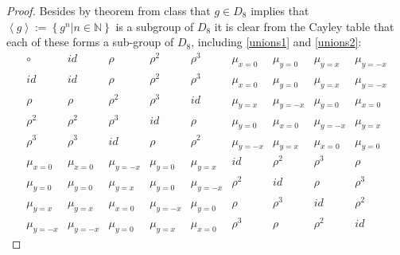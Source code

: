 \documentclass{article}
\theoremstyle{definition}
\newcommand{\N}{\mathbb{N}}
\begin{document}
\begin{proof}
		Besides by theorem from class that $g\in D_8$ implies that $\left\langle g\right\rangle := \left\{g^n|n\in\N\right\}$ is a subgroup of $D_8$ it is clear from the Cayley table that each of these forms a sub-group of $D_8$, including \eqref{unions1} and \eqref{unions2}:
		$$\begin{array}{c|cccccccc}
		\circ & id & \rho & \rho^2 & \rho^3 & \mu_{x=0} & \mu_{y=0} & \mu_{y=x} & \mu_{y=-x} \\ \hline
		id & id & \rho & \rho^2 & \rho^3 & \mu_{x=0} & \mu_{y=0} & \mu_{y=x} & \mu_{y=-x} \\ 
		\rho & \rho &  \rho^2&  \rho^3&  id&  \mu_{y=x}&  \mu_{y=-x}&  \mu_{y=0}&  \mu_{x=0}\\ 
		\rho^2&  \rho^2&  \rho^3&  id&  \rho&  \mu_{y=0}&  \mu_{x=0}&  \mu_{y=-x}&  \mu_{y=x}\\ 
		\rho^3&  \rho^3&  id&  \rho&  \rho^2&  \mu_{y=-x}&  \mu_{y=x}&  \mu_{x=0}&  \mu_{y=0}\\ 
		\mu_{x=0}&  \mu_{x=0}&  \mu_{y=-x}&  \mu_{y=0}&  \mu_{y=x}&  id&  \rho^2&  \rho^3&  \rho\\ 
		\mu_{y=0}&  \mu_{y=0}&  \mu_{y=x}&  \mu_{y=0}&  \mu_{y=-x}&  \rho^2&  id&  \rho&  \rho^3\\ 
		\mu_{y=x}&  \mu_{y=x}&  \mu_{x=0}&  \mu_{y=-x}&  \mu_{y=0}&  \rho&  \rho^3&  id&  \rho^2\\ 
		\mu_{y=-x}&  \mu_{y=-x}&  \mu_{y=0}&  \mu_{y=x}&  \mu_{x=0}&  \rho^3&  \rho&  \rho^2&  id 
		\end{array} $$
	\end{proof}
	
\end{document}
